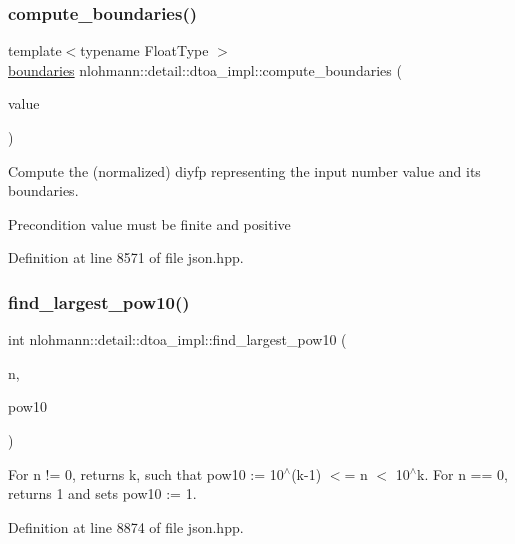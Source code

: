 \subsubsection{\texorpdfstring{compute\+\_\+boundaries()}{compute\_boundaries()}}
{\footnotesize\ttfamily template$<$typename Float\+Type $>$ \\
\hyperlink{structnlohmann_1_1detail_1_1dtoa__impl_1_1boundaries}{boundaries} nlohmann\+::detail\+::dtoa\+\_\+impl\+::compute\+\_\+boundaries (\begin{DoxyParamCaption}\item[{Float\+Type}]{value }\end{DoxyParamCaption})}

Compute the (normalized) diyfp representing the input number \textquotesingle{}value\textquotesingle{} and its boundaries.

\begin{DoxyPrecond}{Precondition}
value must be finite and positive 
\end{DoxyPrecond}


Definition at line 8571 of file json.\+hpp.

\mbox{\label{namespacenlohmann_1_1detail_1_1dtoa__impl_a264df2b5a7e19b864859161f3501155e}} 
\subsubsection{\texorpdfstring{find\+\_\+largest\+\_\+pow10()}{find\_largest\_pow10()}}
{\footnotesize\ttfamily int nlohmann\+::detail\+::dtoa\+\_\+impl\+::find\+\_\+largest\+\_\+pow10 (\begin{DoxyParamCaption}\item[{const uint32\+\_\+t}]{n,  }\item[{uint32\+\_\+t \&}]{pow10 }\end{DoxyParamCaption})\hspace{0.3cm}{\ttfamily [inline]}}

For n != 0, returns k, such that pow10 \+:= 10$^\wedge$(k-\/1) $<$= n $<$ 10$^\wedge$k. For n == 0, returns 1 and sets pow10 \+:= 1. 

Definition at line 8874 of file json.\+hpp.

